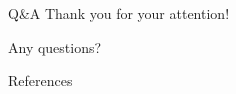 \documentclass{beamer}
\begin{document}
\begin{frame}{Q\&A}
    \centering
    \Huge{Thank you for your attention!}

    \vspace{0.5cm}

    \Large{Any questions?}
\end{frame}

\begin{frame}[allowframebreaks]{References}
    \nocite{*} %
     
    
\end{frame}
\end{document}
